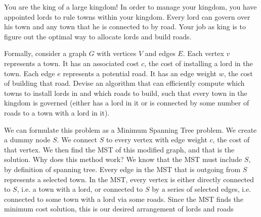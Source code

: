 \begin{blocksection}
\question You are the king of a large kingdom! In order to manage your kingdom, you have appointed lords to rule towns within your kingdom. Every lord can govern over his town and any town that he is connected to by road. Your job as king is to figure out the optimal way to allocate lords and build roads.

Formally, consider a graph $G$ with vertices $V$ and edges $E$. Each vertex $v$ represents a town. It has an associated cost $c$, the cost of installing a lord in the town. Each edge $e$ represents a potential road. It has an edge weight $w$, the cost of building that road. Devise an algorithm that can efficiently compute which towns to install lords in and which roads to build, such that every town in the kingdom is governed (either has a lord in it or is connected by some number of roads to a town with a lord in it).

\begin{solution}[1.5in]
  We can formulate this problem as a Minimum Spanning Tree problem. We create a dummy node $S$. We connect $S$ to every vertex with edge weight $c$, the cost of that vertex. We then find the MST of this modified graph, and that is the solution. Why does this method work? We know that the MST must include $S$, by definition of spanning tree. Every edge in the MST that is outgoing from $S$ represents a selected town. In the MST, every vertex is either directly connected to $S$, i.e. a town with a lord, or connected to $S$ by a series of selected edges, i.e. connected to some town with a lord via some roads. Since the MST finds the minimum cost solution, this is our desired arrangement of lords and roads
\end{solution}
\end{blocksection}